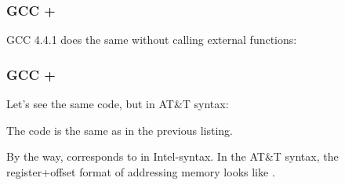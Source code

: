 \ifdefined\IncludeGCC
\subsubsection{GCC + \IntelSyntax}

GCC 4.4.1 does the same without calling external functions:



\subsubsection{GCC + \ATTSyntax}

Let's see the same code, but in AT\&T syntax:



\myindex{\ATTSyntax}
The code is the same as in the previous listing.

By the way,  corresponds to  in Intel-syntax.
In the AT\&T syntax, the register+offset format of addressing memory looks like .
\fi

